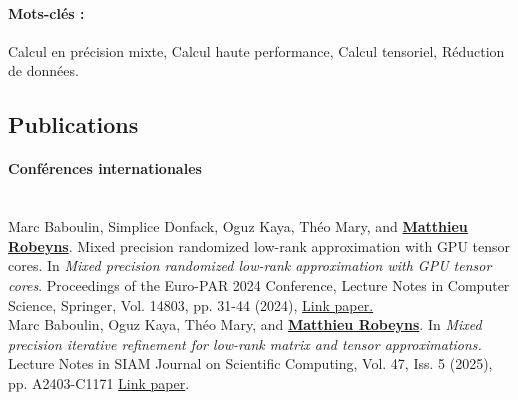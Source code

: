 
\paragraph*{Mots-clés :} Calcul en précision mixte, Calcul haute performance, Calcul tensoriel, Réduction de données.

\subsection{Publications}

\paragraph*{Conférences internationales}\mbox{}\\[5pt]
Marc Baboulin, Simplice Donfack, Oguz Kaya, Théo Mary, and \underline{\bfseries Matthieu Robeyns}.
Mixed precision randomized low-rank approximation with GPU tensor cores.
In \textit{Mixed precision randomized low-rank approximation with GPU tensor cores}.
Proceedings of the Euro-PAR 2024 Conference, Lecture Notes in Computer Science, Springer, Vol. 14803, pp. 31-44 (2024),
\href{https://hal.science/LISN/hal-04520893v1}{Link paper.}
\mbox{}\\[10pt]

\noindent
Marc Baboulin, Oguz Kaya, Théo Mary, and \underline{\bfseries Matthieu Robeyns}.
In \textit{Mixed precision iterative refinement for low-rank matrix and tensor approximations.}
Lecture Notes in SIAM Journal on Scientific Computing, Vol. 47, Iss. 5 (2025), pp. A2403-C1171
\href{https://hal.science/hal-04115337v1/file/Paper.pdf}{Link paper}.
\mbox{}\\[10pt]

